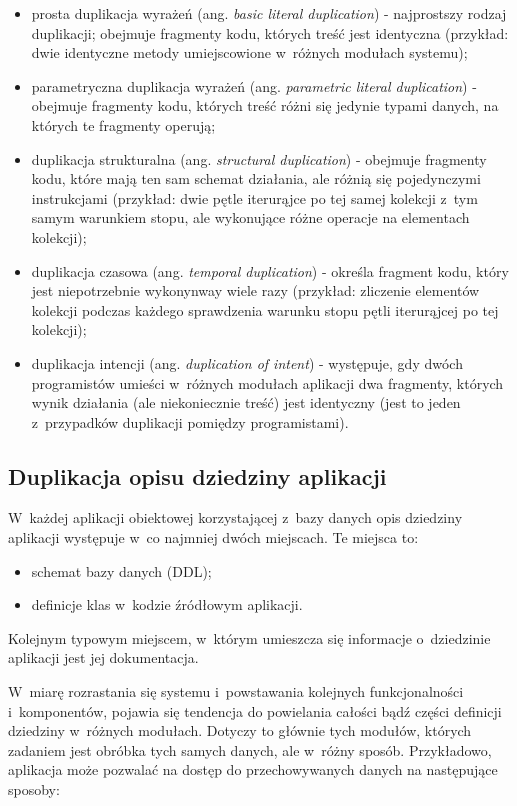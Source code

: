 \begin{itemize}
 \item prosta duplikacja wyrażeń (ang. \emph{basic literal duplication}) - najprostszy rodzaj duplikacji; obejmuje fragmenty kodu, których treść jest identyczna (przykład: dwie identyczne metody umiejscowione w~różnych modułach systemu);
 \item parametryczna duplikacja wyrażeń (ang. \emph{parametric literal duplication}) - obejmuje fragmenty kodu, których treść różni się jedynie typami danych, na których te fragmenty operują;
 \item duplikacja strukturalna (ang. \emph{structural duplication}) - obejmuje fragmenty kodu, które mają ten sam schemat działania, ale różnią się pojedynczymi instrukcjami (przykład: dwie pętle iterurąjce po tej samej kolekcji z~tym samym warunkiem stopu, ale wykonujące różne operacje na elementach kolekcji);
 \item duplikacja czasowa (ang. \emph{temporal duplication}) - określa fragment kodu, który jest niepotrzebnie wykonynway wiele razy (przykład: zliczenie elementów kolekcji podczas każdego sprawdzenia warunku stopu pętli iterurąjcej po tej kolekcji);
 \item duplikacja intencji (ang. \emph{duplication of intent}) - występuje, gdy dwóch programistów umieści w~różnych modułach aplikacji dwa fragmenty, których wynik działania (ale niekoniecznie treść) jest identyczny (jest to jeden z~przypadków duplikacji pomiędzy programistami).
\end{itemize}


\subsection{Duplikacja opisu dziedziny aplikacji}

W~każdej aplikacji obiektowej korzystającej z~bazy danych opis dziedziny aplikacji występuje w~co najmniej dwóch miejscach.
Te miejsca to:

\begin{itemize}
 \item schemat bazy danych (DDL);
 \item definicje klas w~kodzie źródłowym aplikacji.
\end{itemize}

Kolejnym typowym miejscem, w~którym umieszcza się informacje o~dziedzinie aplikacji jest jej dokumentacja.

W~miarę rozrastania się systemu i~powstawania kolejnych funkcjonalności i~komponentów, pojawia się tendencja do powielania całości bądź części definicji dziedziny w~różnych modułach.
Dotyczy to głównie tych modułów, których zadaniem jest obróbka tych samych danych, ale w~różny sposób.
Przykładowo, aplikacja może pozwalać na dostęp do przechowywanych danych na następujące sposoby:

